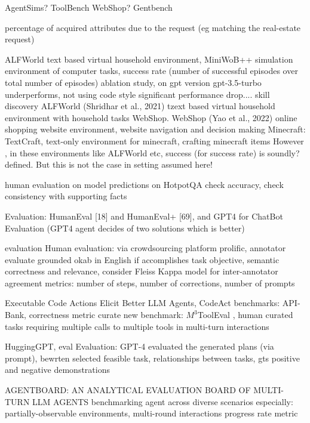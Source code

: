\documentclass{article}
\begin{document}

AgentSims?
ToolBench
WebShop?
Gentbench

\cite{gur_real-world_2023} percentage of acquired attributes due to the request (eg matching the real-estate request)

\cite{sun_adaplanner_2023-1} ALFWorld text based virtual household environment, MiniWoB++ simulation environment of computer tasks, success rate (number of successful episodes over total number of episodes)
ablation study, on gpt version  gpt-3.5-turbo underperforms, not using code style significant performance drop.... skill discovery
ALFWorld (Shridhar et al., 2021) tzext based virtual household environment with household tasks
WebShop. WebShop (Yao et al., 2022) online shopping website environment, website navigation and decision making
Minecraft:
\cite{prasad_adapt_2023} TextCraft, text-only environment for minecraft, crafting minecraft items
However , in these environments like ALFWorld etc, success (for success rate) is soundly? defined. But this is not the case in setting assumed here!

\cite{ouyang_autoplan_2023}
human evaluation on model predictions on HotpotQA
check accuracy, check consistency with supporting facts

\cite{li_camel_2023}
Evaluation: HumanEval [18] and HumanEval+ [69], and GPT4 for ChatBot Evaluation (GPT4 agent decides of two solutions which is better)

\cite{raman_cape_2023} evaluation
Human evaluation: via crowdsourcing platform prolific, annotator evaluate grounded okab in English if accomplishes task objective, semantic correctness and relevance, consider Fleiss Kappa model for inter-annotator agreement
metrics: number of steps, number of corrections, number of prompts

\cite{wang_executable_2024} Executable Code Actions Elicit Better LLM Agents, CodeAct
benchmarks: API-Bank, correctness metric
curate new benchmark: $M^3$ToolEval , human curated tasks requiring multiple calls to multiple tools in multi-turn interactions

\cite{shen_hugginggpt_2023} HuggingGPT, eval
Evaluation: GPT-4 evaluated the generated plans (via prompt), bewrten selected feasible task, relationships between tasks, gts positive and negative demonstrations

\cite{ma_agentboard_2024} AGENTBOARD: AN ANALYTICAL EVALUATION BOARD OF MULTI-TURN LLM AGENTS
benchmarking agent across diverse scenarios
especially: partially-observable environments, multi-round interactions
progress rate metric
\end{document}
